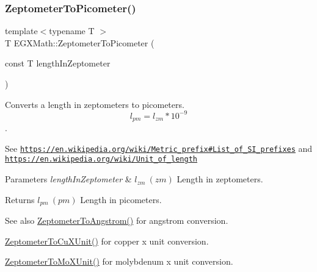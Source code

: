 \subsubsection{\texorpdfstring{Zeptometer\+To\+Picometer()}{ZeptometerToPicometer()}}
{\footnotesize\ttfamily template$<$typename T $>$ \\
T E\+G\+X\+Math\+::\+Zeptometer\+To\+Picometer (\begin{DoxyParamCaption}\item[{const T}]{length\+In\+Zeptometer }\end{DoxyParamCaption})}



Converts a length in zeptometers to picometers. \[ l_{pm}=l_{zm} * 10^{-9} \]. 

See \href{https://en.wikipedia.org/wiki/Metric_prefix#List_of_SI_prefixes}{\tt https\+://en.\+wikipedia.\+org/wiki/\+Metric\+\_\+prefix\#\+List\+\_\+of\+\_\+\+S\+I\+\_\+prefixes} and \href{https://en.wikipedia.org/wiki/Unit_of_length}{\tt https\+://en.\+wikipedia.\+org/wiki/\+Unit\+\_\+of\+\_\+length} 
\begin{DoxyParams}{Parameters}
{\em length\+In\+Zeptometer} & $ l_{zm}\ (zm)$ Length in zeptometers. \\
\hline
\end{DoxyParams}
\begin{DoxyReturn}{Returns}
$ l_{pm}\ (pm)$ Length in picometers. 
\end{DoxyReturn}
\begin{DoxySeeAlso}{See also}
\mbox{\hyperlink{group___e_g_x_math-_conversions-_length_conversions-_zeptometer-_non-_s_i_gaa7023afd2a269dddf741cb4299803ef2}{Zeptometer\+To\+Angstrom()}} for angstrom conversion. 

\mbox{\hyperlink{group___e_g_x_math-_conversions-_length_conversions-_zeptometer-_non-_s_i_gaeeff3d1ea7d8cd0c703419ce16fcadd7}{Zeptometer\+To\+Cu\+X\+Unit()}} for copper x unit conversion. 

\mbox{\hyperlink{group___e_g_x_math-_conversions-_length_conversions-_zeptometer-_non-_s_i_gaa621a874847d7e6aae8d04395c68a313}{Zeptometer\+To\+Mo\+X\+Unit()}} for molybdenum x unit conversion. 
\end{DoxySeeAlso}
\mbox{\label{group___e_g_x_math-_conversions-_length_conversions-_zeptometer-_s_i_ga442c02caa8b630c3f90675191b22bca5}} 
